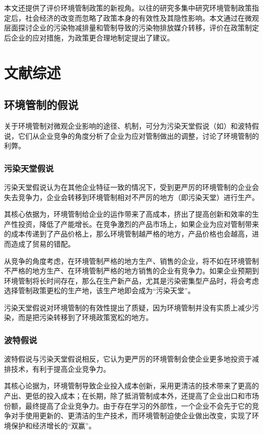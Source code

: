 \documentclass{ctexart}
\begin{document}
本文还提供了评价环境管制政策的新视角。以往的研究多集中研究环境管制政策指定后，社会经济的改变而忽略了政策本身的有效性及其隐性影响。本文通过在微观层面探讨企业的污染物减排量和管制导致的污染物排放媒介转移，评价在政策制定后企业的应对措施，为政策更合理地制定提出了建议。


\section{文献综述}
\subsection{环境管制的假说}
关于环境管制对微观企业影响的途径、机制，可分为污染天堂假说（如\textcite{mcguire1982regulation}）和波特假说\cite{porter1995green,porter1995toward}，它们从企业竞争的角度分析了企业为应对管制做出的调整，讨论了环境管制的利弊。
\subsubsection{污染天堂假说}
污染天堂假说认为在其他企业特征一致的情况下，受到更严厉的环境管制的企业会失去竞争力，企业会转移到环境管制相对不严厉的地方（即污染天堂）进行生产。

其核心依据为，环境管制给企业的运作带来了高成本，挤出了提高创新和效率的生产性投资，降低了产能增长。在竞争激烈的产品市场上，如果企业为应对管制带来的成本传递到了产品价格上，那么环境管制越严格的地方，产品价格也会越高，进而造成了贸易的错配。

从竞争的角度考虑，在环境管制严格的地方生产、销售的企业，将不如在环境管制不严格的地方生产、在环境管制严格的地方销售的企业有竞争力。如果企业预期到环境管制将长时间存在，那么在生产新产品，尤其是污染密集型产品时，将会考虑选择管制政策更松的生产地，该生产地即会成为“污染天堂”\cite{dechezlepretre2017impacts}。

污染天堂假说对环境管制的有效性提出了质疑，因为环境管制并没有实质上减少污染，而是把污染转移到了环境政策宽松的地方。
\subsubsection{波特假说}
波特假说与污染天堂假说相反，它认为更严厉的环境管制会使企业更多地投资于减排技术，有利于提高企业竞争力。

其核心论据为，环境管制导致企业投入成本创新，采用更清洁的技术带来了更高的产出、更低的投入成本；在长期，除了抵消管制成本外，还提高了企业出口和市场份额，最终提高了企业竞争力。由于存在学习的外部性，一个企业不会先于它的竞争对手使用更新的、更清洁的生产技术，而环境管制迫使企业做出改变，实现了环境保护和经济增长的“双赢”\cite{王兵2008环境管制与全要素生产率增长}。
\end{document}
